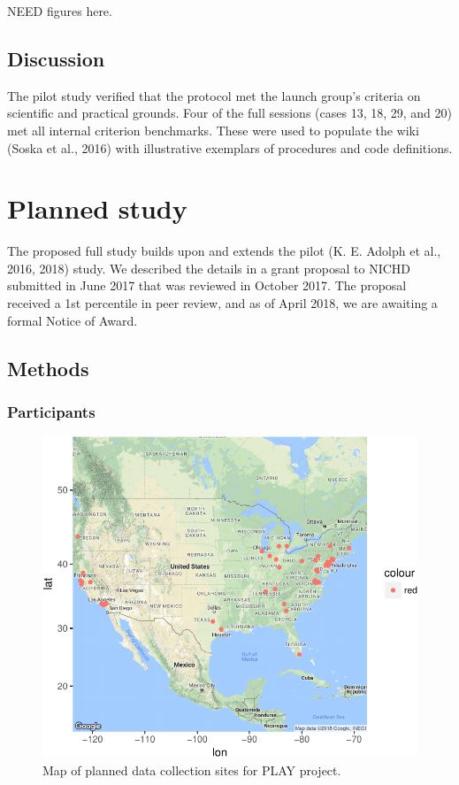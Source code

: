 \documentclass[english,man]{apa6}
\theoremstyle{definition}
\theoremstyle{definition}
\theoremstyle{definition}
\theoremstyle{remark}
\begin{document}
NEED figures here.

\subsection{Discussion}\label{discussion}

The pilot study verified that the protocol met the launch group's
criteria on scientific and practical grounds. Four of the full sessions
(cases 13, 18, 29, and 20) met all internal criterion benchmarks. These
were used to populate the wiki (Soska et al., 2016) with illustrative
exemplars of procedures and code definitions.

\section{Planned study}\label{planned-study}

The proposed full study builds upon and extends the pilot (K. E. Adolph
et al., 2016, 2018) study. We described the details in a grant proposal
to NICHD submitted in June 2017 that was reviewed in October 2017. The
proposal received a 1st percentile in peer review, and as of April 2018,
we are awaiting a formal Notice of Award.

\subsection{Methods}\label{methods-1}

\subsubsection{Participants}\label{participants-1}

\begin{figure}

{\centering \includegraphics{figs/PLAY-collection-map-1} 

}

\caption{Map of planned data collection sites for PLAY project.}\label{fig:play-site-map}
\end{figure}
\end{document}
